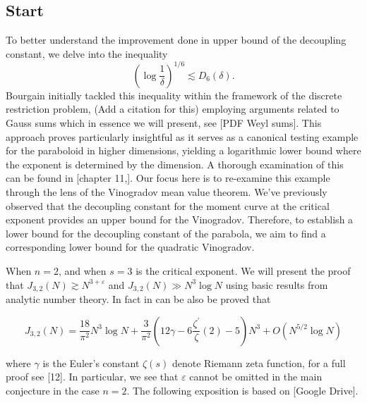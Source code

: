 \subsection{Start}
To better understand the improvement done in upper bound of the decoupling constant, we delve into the inequality $$\left(\log \frac{1}{\delta}\right)^{1 / 6} \lesssim D_{6}(\delta).$$ Bourgain initially tackled this inequality within the framework of the discrete restriction problem,   (Add a citation for this) employing arguments related to Gauss sums which in essence we will present, see [PDF Weyl sums]. This approach proves particularly insightful as it serves as a canonical testing example for the paraboloid in higher dimensions, yielding a logarithmic lower bound where the exponent is determined by the dimension. A thorough examination of this can be found in [chapter 11,].  Our focus here is to re-examine this example through the lens of the Vinogradov mean value theorem.  We've previously observed that the decoupling constant for the moment curve at the critical exponent provides an upper bound for the Vinogradov.  Therefore, to establish a lower bound for the decoupling constant of the parabola, we aim to find a corresponding lower bound for the quadratic Vinogradov.



When $n=2$, and when $s=3$ is the critical exponent.
We will present the proof that $J_{3,2}(N){ }\gtrsim N^{3+\varepsilon}$ and $J_{3,2}(N) \gg N^{3} \log N$ using basic results from analytic number theory. In fact in can be also be proved that 

$$
J_{3,2}(N)=\frac{18}{\pi^{2}} N^{3} \log N+\frac{3}{\pi^{2}}\left(12 \gamma-6 \frac{\zeta^{\prime}}{\zeta}(2)-5\right) N^{3}+O\left(N^{5 / 2} \log N\right)
$$

where $\gamma$ is the Euler's constant $\zeta(s)$ denote Riemann zeta function, for a full proof see [12]. In particular, we see that $\varepsilon$ cannot be omitted in the main conjecture in the case $n=2$. The following exposition is based on [Google Drive].

